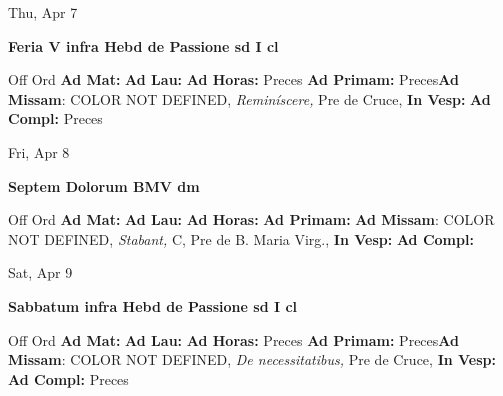 \documentclass[10pt]{book}
\begin{document}
\begin{center}
\begin{minipage}{3.5in}
\vspace{2em}
\begin{center}Thu, Apr 7
\end{center}
\textbf{ \large Feria V infra Hebd de Passione
\textnormal{\normalsize sd I cl}}

\begin{justify}Off Ord
\textbf{Ad Mat: }
\textbf{Ad Lau: }
\textbf{Ad Horas: }Preces
\textbf{Ad Primam: }Preces\textbf{Ad Missam}: COLOR NOT DEFINED, \textit{Reminíscere,} Pre de Cruce, 
\textbf{In Vesp: }
\textbf{Ad Compl: }Preces
\end{justify}
\end{minipage}
\end{center}

\begin{center}
\begin{minipage}{3.5in}
\vspace{2em}
\begin{center}Fri, Apr 8
\end{center}
\textbf{ \large Septem Dolorum BMV
\textnormal{\normalsize dm}}

\begin{justify}Off Ord
\textbf{Ad Mat: }
\textbf{Ad Lau: }
\textbf{Ad Horas: }
\textbf{Ad Primam: }\textbf{Ad Missam}: COLOR NOT DEFINED, \textit{Stabant,} C, Pre de B. Maria Virg., 
\textbf{In Vesp: }
\textbf{Ad Compl: }
\end{justify}
\end{minipage}
\end{center}

\begin{center}
\begin{minipage}{3.5in}
\vspace{2em}
\begin{center}Sat, Apr 9
\end{center}
\textbf{ \large Sabbatum infra Hebd de Passione
\textnormal{\normalsize sd I cl}}

\begin{justify}Off Ord
\textbf{Ad Mat: }
\textbf{Ad Lau: }
\textbf{Ad Horas: }Preces
\textbf{Ad Primam: }Preces\textbf{Ad Missam}: COLOR NOT DEFINED, \textit{De necessitatibus,} Pre de Cruce, 
\textbf{In Vesp: }
\textbf{Ad Compl: }Preces
\end{justify}
\end{minipage}
\end{center}
\end{document}
